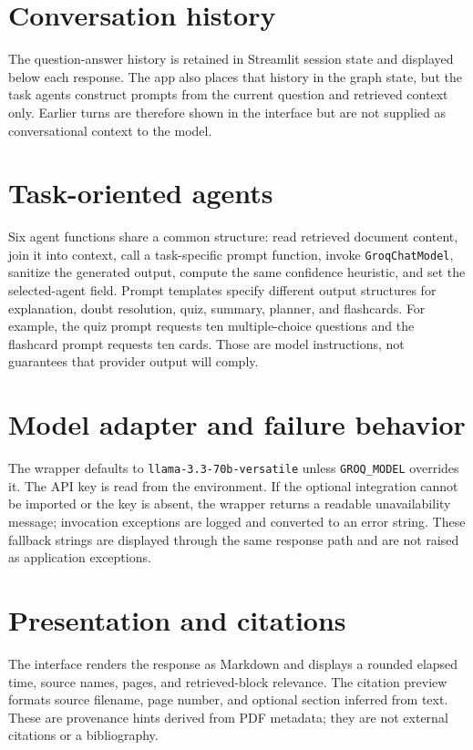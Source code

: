 \section{Conversation history}
The question-answer history is retained in Streamlit session state and displayed below each response. The app also places that history in the graph state, but the task agents construct prompts from the current question and retrieved context only. Earlier turns are therefore shown in the interface but are not supplied as conversational context to the model.

\section{Task-oriented agents}
Six agent functions share a common structure: read retrieved document content, join it into context, call a task-specific prompt function, invoke \texttt{GroqChatModel}, sanitize the generated output, compute the same confidence heuristic, and set the selected-agent field. Prompt templates specify different output structures for explanation, doubt resolution, quiz, summary, planner, and flashcards. For example, the quiz prompt requests ten multiple-choice questions and the flashcard prompt requests ten cards. Those are model instructions, not guarantees that provider output will comply.

\section{Model adapter and failure behavior}
The wrapper defaults to \texttt{llama-3.3-70b-versatile} unless \texttt{GROQ\_MODEL} overrides it. The API key is read from the environment. If the optional integration cannot be imported or the key is absent, the wrapper returns a readable unavailability message; invocation exceptions are logged and converted to an error string. These fallback strings are displayed through the same response path and are not raised as application exceptions.

\section{Presentation and citations}
The interface renders the response as Markdown and displays a rounded elapsed time, source names, pages, and retrieved-block relevance. The citation preview formats source filename, page number, and optional section inferred from text. These are provenance hints derived from PDF metadata; they are not external citations or a bibliography.

